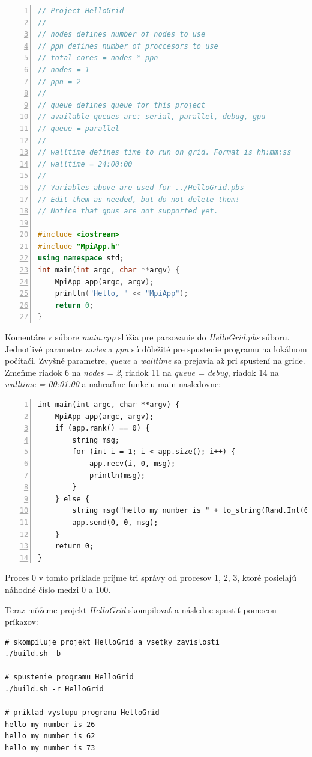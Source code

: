 \begin{lstlisting}[language=c++, caption={HelloGrid/src/main.cpp}, numbers=left]
// Project HelloGrid
//
// nodes defines number of nodes to use
// ppn defines number of proccesors to use
// total cores = nodes * ppn
// nodes = 1
// ppn = 2
//
// queue defines queue for this project
// available queues are: serial, parallel, debug, gpu
// queue = parallel
//
// walltime defines time to run on grid. Format is hh:mm:ss
// walltime = 24:00:00
//
// Variables above are used for ../HelloGrid.pbs
// Edit them as needed, but do not delete them!
// Notice that gpus are not supported yet.

#include <iostream>
#include "MpiApp.h"
using namespace std;
int main(int argc, char **argv) {
    MpiApp app(argc, argv);
    println("Hello, " << "MpiApp");
    return 0;
}
\end{lstlisting}
Komentáre v súbore \textit{main.cpp} slúžia pre parsovanie do \textit{HelloGrid.pbs} súboru.
Jednotlivé parametre \textit{nodes} a \textit{ppn} sú dôležité pre spustenie programu na lokálnom počítači. Zvyšné parametre, \textit{queue} a \textit{walltime} sa prejavia až pri spustení na gride.
Zmeňme riadok 6 na \textit{nodes = 2}, riadok 11 na \textit{queue = debug}, riadok 14 na \textit{walltime = 00:01:00}
a nahraďme funkciu main nasledovne:
\begin{lstlisting}[numbers=left]
int main(int argc, char **argv) {
    MpiApp app(argc, argv);
    if (app.rank() == 0) {
        string msg;
        for (int i = 1; i < app.size(); i++) {
            app.recv(i, 0, msg);
            println(msg);
        }
    } else {
        string msg("hello my number is " + to_string(Rand.Int(0, 100)));
        app.send(0, 0, msg);
    }
    return 0;
}  
\end{lstlisting}
Proces 0 v tomto príklade príjme tri správy od procesov 1, 2, 3, ktoré posielajú náhodné číslo medzi 0 a 100.

Teraz môžeme projekt \textit{HelloGrid} skompilovať a následne spustiť pomocou príkazov:
\begin{lstlisting}
# skompiluje projekt HelloGrid a vsetky zavislosti
./build.sh -b

# spustenie programu HelloGrid
./build.sh -r HelloGrid

# priklad vystupu programu HelloGrid
hello my number is 26
hello my number is 62
hello my number is 73
\end{lstlisting}


